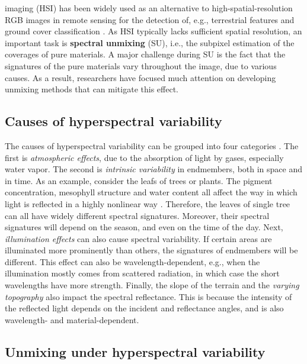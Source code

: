  imaging  (HSI) has been widely used as an alternative to high-spatial-resolution RGB images in remote sensing for the detection of, e.g., terrestrial features and ground cover classification \cite{shaw_spectral_2003}. As HSI typically lacks sufficient spatial resolution, an important task is \textbf{spectral unmixing} (SU), i.e., the subpixel  estimation of the coverages of pure materials. A major challenge during SU is the fact that the signatures of the pure materials vary throughout the image, due to various causes. As a result, researchers have focused much attention on developing unmixing methods that can mitigate this effect.

\subsection{Causes of hyperspectral variability}

The causes of hyperspectral variability can be grouped into four categories \cite{borsoi_spectral_2021}. The first is \emph{atmospheric effects}, due to the absorption of light by gases, especially water vapor. The second is \emph{intrinsic variability} in endmembers, both in space and in time. As an example, consider the leafs of trees or plants. The pigment concentration, mesophyll structure and water content all affect the way in which light is reflected in a highly nonlinear way \cite{jacquemoud_prospect_1990, karabourniotis_optical_2021}. Therefore, the leaves of single tree can all have widely different spectral signatures. Moreover, their spectral signatures will depend on the season, and even on the time of the day. Next, \emph{illumination effects} can also cause spectral variability. If certain areas are illuminated more prominently than others, the signatures of endmembers will be different. This effect can also be wavelength-dependent, e.g., when the illumination mostly comes from scattered radiation, in which case the short wavelengths have more strength. Finally, the slope of the terrain and the \emph{varying topography} also impact the spectral reflectance. This is because the intensity of the reflected light depends on the incident and reflectance angles, and is also wavelength- and material-dependent.

\subsection{Unmixing under hyperspectral variability}

